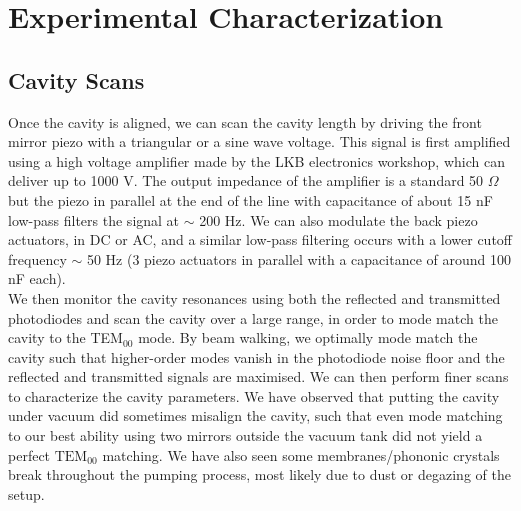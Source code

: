 \section{Experimental Characterization}
\subsection{Cavity Scans}


Once the cavity is aligned, we can scan the cavity length by driving the front mirror piezo with a triangular or a sine wave voltage. This signal is first amplified using a high voltage amplifier made by the LKB electronics workshop, which can deliver up to 1000 V. The output impedance of the amplifier is a standard 50 $\Omega$ but the piezo in parallel at the end of the line with capacitance of about 15 nF low-pass filters the signal at  $\sim$ 200 Hz. We can also modulate the back piezo actuators, in DC or AC, and a similar low-pass filtering occurs with a lower cutoff frequency $\sim$ 50 Hz (3 piezo actuators in parallel with a capacitance of around 100 nF each). \\ 

We then monitor the cavity resonances using both the reflected and transmitted photodiodes and scan the cavity over a large range, in order to mode match the cavity to the TEM$_{00}$ mode. By beam walking, we optimally mode match the cavity such that higher-order modes vanish in the photodiode noise floor and the reflected and transmitted signals are maximised. We can then perform finer scans to characterize the cavity parameters. We have observed that putting the cavity under vacuum did sometimes misalign the cavity, such that even mode matching to our best ability using two mirrors outside the vacuum tank did not yield a perfect $\text{TEM}_{00}$ matching. We have also seen some membranes/phononic crystals break throughout the pumping process, most likely due to dust or degazing of the setup. \\

